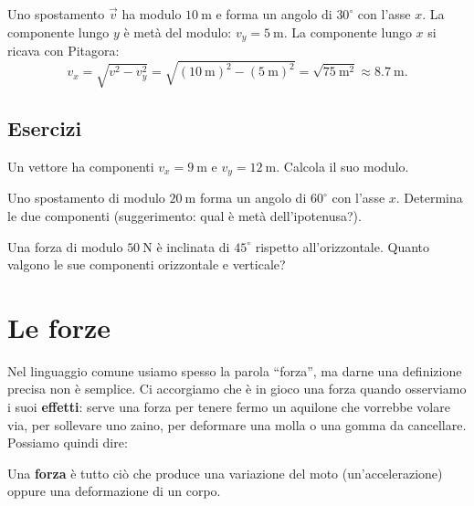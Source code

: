 \begin{testexample}
Uno spostamento $\vec{v}$ ha modulo $\SI{10}{\meter}$ e forma un angolo di $30^\circ$ con l'asse $x$. La componente lungo $y$ è metà del modulo: $v_y = \SI{5}{\meter}$. La componente lungo $x$ si ricava con Pitagora:
\[
v_x = \sqrt{v^2 - v_y^2} = \sqrt{(\SI{10}{\meter})^2 - (\SI{5}{\meter})^2} = \sqrt{\SI{75}{\meter\squared}} \approx \SI{8,7}{\meter}.
\]
\end{testexample}

\subsection{Esercizi}

\begin{esercizio}
Un vettore ha componenti $v_x = \SI{9}{\meter}$ e $v_y = \SI{12}{\meter}$. Calcola il suo modulo.\\
\end{esercizio}

\begin{esercizio}
Uno spostamento di modulo $\SI{20}{\meter}$ forma un angolo di $60^\circ$ con l'asse $x$. Determina le due componenti (suggerimento: qual è metà dell'ipotenusa?).\\
\end{esercizio}

\begin{esercizio}
Una forza di modulo $\SI{50}{\newton}$ è inclinata di $45^\circ$ rispetto all'orizzontale. Quanto valgono le sue componenti orizzontale e verticale?\\
\end{esercizio}


\section{Le forze}

Nel linguaggio comune usiamo spesso la parola ``forza'', ma darne una definizione precisa non è semplice. Ci accorgiamo che è in gioco una forza quando osserviamo i suoi \textbf{effetti}: serve una forza per tenere fermo un aquilone che vorrebbe volare via, per sollevare uno zaino, per deformare una molla o una gomma da cancellare. Possiamo quindi dire:

\begin{definizione}
Una \textbf{forza} è tutto ciò che produce una variazione del moto (un'accelerazione) oppure una deformazione di un corpo.
\end{definizione}

